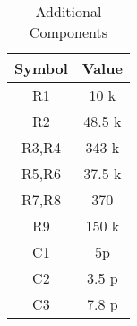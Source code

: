 \begin{table}[h]
\centering
\caption{Additional Components}
\label{res_specs}
\begin{tabular}{c|c}
\textbf{Symbol} & \textbf{Value} \\ \hline
R1              & 10 k           \\
R2              & 48.5 k         \\
R3,R4           & 343 k          \\
R5,R6           & 37.5 k         \\
R7,R8           & 370            \\
R9              & 150 k           \\
C1              & 5p             \\
C2              & 3.5 p          \\
C3              & 7.8 p          \\


\end{tabular}
\end{table}
